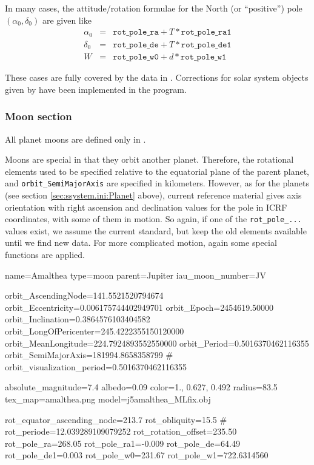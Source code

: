\noindent In many cases, the attitude/rotation formulae for the North (or
``positive'') pole $(\alpha_0, \delta_0)$ are given like
\begin{eqnarray}
  \label{eq:PlanetOrientation}
  \alpha_0 &=& \mathtt{rot\_pole\_ra} + T * \mathtt{rot\_pole\_ra1}\\
  \delta_0 &=& \mathtt{rot\_pole\_de} + T * \mathtt{rot\_pole\_de1}\\
  W        &=& \mathtt{rot\_pole\_w0} + d * \mathtt{rot\_pole\_w1}
\end{eqnarray}

\noindent These cases are fully covered by the data in
. Corrections for solar system objects given
by \citet{ESAA:2013, WGCCRE2009, WGCCRE2009:corr, WGCCRE2015,
  WGCCRE2015:corr} have been implemented in the program.


\subsubsection{Moon section}
\label{sec:ssystem.ini:Moon}

All planet moons are defined only in .

Moons are special in that they orbit another planet. Therefore, the
rotational elements used to be specified relative to the equatorial
plane of the parent planet, and \texttt{orbit\_SemiMajorAxis} are
specified in kilometers.  However,  as for the
planets (see section \ref{sec:ssystem.ini:Planet} above), current
 reference material gives axis orientation with right
ascension and declination values for the pole in ICRF coordinates,
with some of them in motion. So again, if one of the
\texttt{rot\_pole\_...} values exist, we assume the current
standard, but keep the old elements available until we find new data.
For more complicated motion, again some special functions
are applied.


\begin{configfile}
[amalthea]
name=Amalthea
type=moon
parent=Jupiter
iau_moon_number=JV

orbit_AscendingNode=141.5521520794674
orbit_Eccentricity=0.006175744402949701
orbit_Epoch=2454619.50000
orbit_Inclination=0.3864576103404582
orbit_LongOfPericenter=245.4222355150120000
orbit_MeanLongitude=224.7924893552550000
orbit_Period=0.5016370462116355
orbit_SemiMajorAxis=181994.8658358799
# orbit_visualization_period=0.5016370462116355

absolute_magnitude=7.4
albedo=0.09
color=1., 0.627, 0.492
radius=83.5
tex_map=amalthea.png
model=j5amalthea_MLfix.obj


rot_equator_ascending_node=213.7
rot_obliquity=15.5
# rot_periode=12.039289109079252
rot_rotation_offset=235.50
rot_pole_ra=268.05
rot_pole_ra1=-0.009
rot_pole_de=64.49
rot_pole_de1=0.003
rot_pole_w0=231.67
rot_pole_w1=722.6314560
\end{configfile}

